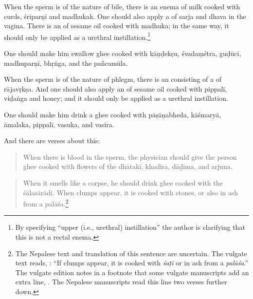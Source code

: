 \begin{translation}
 \item[6.2]
 
 When the sperm is of the nature of bile, there is  an
enema of milk cooked with curds, \gls{śrīparṇī}
and \gls{madhuka}k. %
One should also apply a  of \gls{sarja} and
\gls{dhava} in the vagina. %
There is an  of sesame oil cooked with
\gls{madhuka}; in the same way, it should only be applied as a
urethral instillation.\footnote{By specifying “upper (i.e., urethral) instillation”
    the author is clarifying that this is not a rectal enema.}

  One should make him swallow ghee cooked with 
  \gls{kāṇḍekṣu},
  \gls{śvadaṃśtra},
  \gls{guḍūcī},
  \gls{madhuparṇī},
  \gls{bhṛṅga},
  and 
  the \gls{pañcamūla}.
  
 \item[6.3]
 
When the sperm is of the nature of phlegm, there is  an
 consisting of a   of
\gls{rājavṛkṣa}.  And one should also apply an  of sesame oil cooked with \gls{pippalī}, \gls{viḍaṅga} and
honey; and it should only be applied as a urethral instillation. 

One should make him drink a ghee cooked with 
\gls{pāṣāṇabheda},
\gls{kāśmaryā},
\gls{āmalaka},
\gls{pippalī},
\gls{vasuka}, and 
\gls{vasira}.
 
 
\item [7]
 
  And there are verses about this:
 
 \begin{quote}
     When there is blood in the sperm, the physician should give the person ghee 
 cooked with 
 flowers of the \gls{dhātakī},
 \gls{khadira},
 \gls{dāḍima},
 and \gls{arjuna}.
 \end{quote}
 
 \item [8]
 
\begin{quote}
     When it smells like a corpse, he should drink ghee cooked with
the \gls{śālasārādi}. %
\dag When clumps appear, it is cooked with stones, or also in ash from
a \gls{palāśa}.\footnote{The Nepalese text and translation of this
    sentence are uncertain. The vulgate text reads, :
     “If clumps
    appear, it is cooked with \emph{śaṭī} or in ash from a \emph{palāśa}.”
    The vulgate edition notes in a footnote that some vulgate manuscripts
    add an extra line, . The
    Nepalese manuscripts read this line two verses further down.}
\end{quote}


\end{translation}
